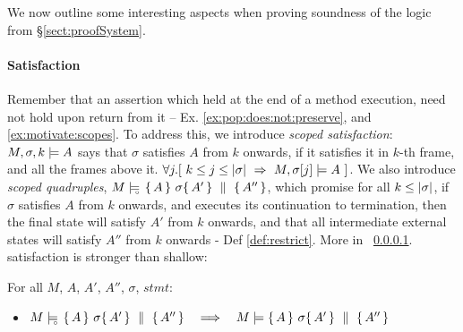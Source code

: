 

We now outline some interesting aspects when proving soundness of the logic from \S \ref{sect:proofSystem}.

 
\paragraph{\Scoped Satisfaction} 
\label{s:scoped:valid}


Remember that an assertion which held at the end of a method execution, need not hold upon return from it -- \cf Ex. \ref{ex:pop:does:not:preserve}, and   \ref{ex:motivate:scopes}. To address this, we introduce \emph{scoped satisfaction}: %
 $ M,\sigma ,{k} \models {A} $   says that $\sigma$ satisfies $A$ from $k$ onwards, if it satisfies it in $k$-th frame,  and all the frames above it. 
\ie $\forall j. [\  k\leq j \leq |\sigma| \ \Rightarrow \ M, \sigma[j] \models A \ ]$.
We also introduce \emph{scoped quadruples},  $M \models\!\!\!\!_{_{\circ}}\   \{\, A \, \}\ \sigma \{\, A' \, \} \, \,\parallel\,\, \{\, A'' \, \} $, which promise for all $k\leq |\sigma|$,  if $\sigma$ satisfies $A$ from $k$ onwards, and executes its continuation to termination, then the final state will satisfy $A'$ from $k$ onwards, and that  all intermediate external states will satisfy $A''$ from $k$ onwards - \cf Def \ref{def:restrict}.
More in \A\ \ref{s:scoped:valid}.
\Scoped satisfaction is stronger than shallow:   
 
\begin{lemma}
For all $M$, $A$, $A'$, $A''$, $\sigma$, $stmt$:  
\begin{itemize}
\item
 $M \models\!\!\!\!_{_{\circ}}\   \{\, A \, \}\ \sigma \{\, A' \, \} \, \,\parallel\,\, \{\, A'' \, \}    \ \ \ \Longrightarrow \ \ \   M \models  \{\, A \, \}\ \sigma \{\, A' \, \} \, \,\parallel\,\, \{\, A'' \, \} $

\end{itemize}
\end{lemma}

